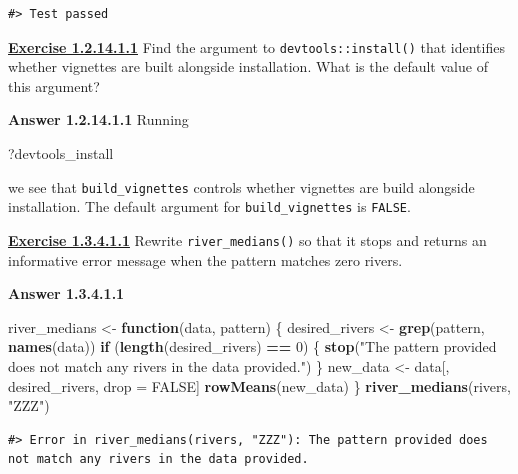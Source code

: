 \documentclass[
]{book}
\newenvironment{Shaded}{\begin{snugshade}}{\end{snugshade}}
\newcommand{\ControlFlowTok}[1]{\textcolor[rgb]{0.13,0.29,0.53}{\textbf{#1}}}
\newcommand{\DecValTok}[1]{\textcolor[rgb]{0.00,0.00,0.81}{#1}}
\newcommand{\KeywordTok}[1]{\textcolor[rgb]{0.13,0.29,0.53}{\textbf{#1}}}
\newcommand{\NormalTok}[1]{#1}
\newcommand{\OperatorTok}[1]{\textcolor[rgb]{0.81,0.36,0.00}{\textbf{#1}}}
\newcommand{\OtherTok}[1]{\textcolor[rgb]{0.56,0.35,0.01}{#1}}
\newcommand{\StringTok}[1]{\textcolor[rgb]{0.31,0.60,0.02}{#1}}
\begin{document}
\begin{verbatim}
#> Test passed
\end{verbatim}

\textbf{\protect\hyperlink{ex-set5}{Exercise 1.2.14.1.1}}
Find the argument to \texttt{devtools::install()} that identifies whether vignettes are built alongside installation. What is the default value of this argument?

\textbf{Answer 1.2.14.1.1} Running

\begin{Shaded}
\begin{Highlighting}[]
\NormalTok{?devtools_install}
\end{Highlighting}
\end{Shaded}

we see that \texttt{build\_vignettes} controls whether vignettes are build alongside installation. The default argument for \texttt{build\_vignettes} is \texttt{FALSE}.

\textbf{\protect\hyperlink{ex-set6}{Exercise 1.3.4.1.1}}
Rewrite \texttt{river\_medians()} so that it stops and returns an informative error message when the pattern matches zero rivers.

\textbf{Answer 1.3.4.1.1}

\begin{Shaded}
\begin{Highlighting}[]
\NormalTok{river_medians <-}\StringTok{ }\ControlFlowTok{function}\NormalTok{(data, pattern) \{}
\NormalTok{  desired_rivers <-}\StringTok{ }\KeywordTok{grep}\NormalTok{(pattern, }\KeywordTok{names}\NormalTok{(data))}
  \ControlFlowTok{if}\NormalTok{ (}\KeywordTok{length}\NormalTok{(desired_rivers) }\OperatorTok{==}\StringTok{ }\DecValTok{0}\NormalTok{) \{}
    \KeywordTok{stop}\NormalTok{(}\StringTok{"The pattern provided does not match any rivers in the data provided."}\NormalTok{)}
\NormalTok{  \}}
\NormalTok{  new_data <-}\StringTok{ }\NormalTok{data[, desired_rivers, drop =}\StringTok{ }\OtherTok{FALSE}\NormalTok{]}
  \KeywordTok{rowMeans}\NormalTok{(new_data)}
\NormalTok{\}}
\KeywordTok{river_medians}\NormalTok{(rivers, }\StringTok{"ZZZ"}\NormalTok{)}
\end{Highlighting}
\end{Shaded}

\begin{verbatim}
#> Error in river_medians(rivers, "ZZZ"): The pattern provided does not match any rivers in the data provided.
\end{verbatim}
\end{document}
